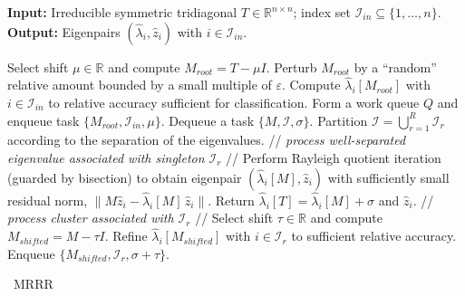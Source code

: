 \documentclass[final]{siamltex}
\newcommand\norm[1]{\lVert#1\rVert}
\begin{document}
\begin{algorithm}[ht]
 \small
    {\bf Input:} Irreducible symmetric tridiagonal $T \in \mathbb{R}^{n
    \times n}$; index set $\mathcal{I}_{in}  \subseteq \{1,\ldots,n\}$. \\
    {\bf Output:} Eigenpairs $(\hat{\lambda}_i, \hat{z}_i)$ with
    $i \in \mathcal{I}_{in}$.
    
    \vspace{1mm}

  \begin{algorithmic}[1]
    \STATE Select shift $\mu \in
    \mathbb{R}$ and compute $M_{root} = T - \mu I$. \label{line:mrrr:root} 
    \STATE Perturb $M_{root}$ by a ``random'' relative amount bounded by a
    small multiple of $\varepsilon$. \label{line:mrrr:perturb}
    \STATE Compute $\hat{\lambda}_i[M_{root}]$ with $i \in \mathcal{I}_{in}$
    to relative accuracy sufficient for classification. 
    \label{line:mrrr:initialeigvals} 
    \STATE Form a work queue $Q$ and enqueue task
    $\{M_{root}, \mathcal{I}_{in}, \mu\}$. \label{line:mrrr:enddlarre}
    \STATE Dequeue a task $\{M, \mathcal{I}, \sigma\}$. \label{line:mrrr:dequeue}
    \STATE Partition $\mathcal{I} = \bigcup_{r=1}^R \mathcal{I}_r$  according 
    to the separation of the eigenvalues. \label{line:mrrr:initialpartitioning}
     \label{line:mrrr:ifstatement} 
    \STATE // {\it process well-separated eigenvalue associated with
      singleton $\mathcal{I}_r$} //
    \STATE Perform Rayleigh quotient iteration (guarded by bisection) to
    obtain eigenpair $(\hat{\lambda}_i[M],\hat{z}_i)$ with sufficiently
    small residual norm, $\norm{M \hat{z}_i - \hat{\lambda}_i[M]
      \,\hat{z}_i}$. \label{line:mrrr:rqi}
    \STATE Return $\hat{\lambda}_i[T] = \hat{\lambda}_i[M] + \sigma$ and
     $\hat{z}_i$. \label{line:mrrr:returneigenpair} 
    \ELSE
    \STATE // {\it process cluster associated with $\mathcal{I}_r$} //
    \STATE Select shift $\tau \in
    \mathbb{R}$ and compute $M_{shifted} = M - \tau
    I$. \label{line:mrrr:shifting}  
    \STATE Refine $\hat{\lambda}_i[M_{shifted}]$ with $i \in \mathcal{I}_r$ to
    sufficient relative 
    accuracy. \label{line:mrrr:refine} 
    \STATE Enqueue $\{M_{shifted}, \mathcal{I}_r, \sigma +
    \tau\}$. \label{line:mrrr:partition} 
    \ENDIF
    \ENDFOR
    \ENDWHILE \label{line:mrrr:end}
  \end{algorithmic}
  \caption{\ MRRR}
  \label{alg:mrrr}
\end{algorithm}
\end{document}
